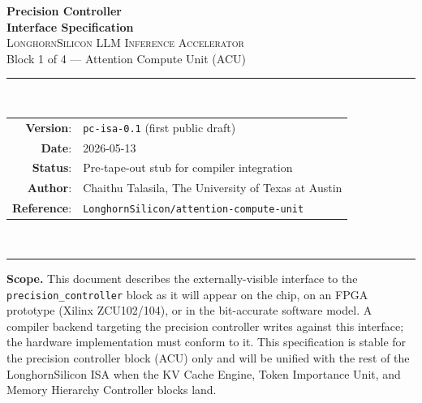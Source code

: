 \documentclass[11pt]{article}
\begin{document}
\thispagestyle{empty}
\begin{center}
\vspace*{1.2in}
{\Huge\bfseries Precision Controller}\\[0.4em]
{\LARGE\bfseries Interface Specification}\\[1.2em]

{\large \textsc{LonghornSilicon LLM Inference Accelerator}}\\[0.4em]
{\large Block 1 of 4 --- Attention Compute Unit (ACU)}\\[2em]

\rule{0.7\textwidth}{0.4pt}\\[1em]

\begin{tabular}{rl}
\textbf{Version}:    & \texttt{pc-isa-0.1} (first public draft) \\
\textbf{Date}:       & 2026-05-13 \\
\textbf{Status}:     & Pre-tape-out stub for compiler integration \\
\textbf{Author}:     & Chaithu Talasila, The University of Texas at Austin \\
\textbf{Reference}:  & \texttt{LonghornSilicon/attention-compute-unit} \\
\end{tabular}\\[1em]
\rule{0.7\textwidth}{0.4pt}

\vfill
\begin{minipage}{0.85\textwidth}
\small
\textbf{Scope.} This document describes the externally-visible interface to the
\texttt{precision\_controller} block as it will appear on the chip, on an
FPGA prototype (Xilinx ZCU102/104), or in the bit-accurate software model.
A compiler backend targeting the precision controller writes against this
interface; the hardware implementation must conform to it. This specification
is stable for the precision controller block (ACU) only and will be unified
with the rest of the LonghornSilicon ISA when the KV Cache Engine, Token
Importance Unit, and Memory Hierarchy Controller blocks land.
\end{minipage}

\vspace{0.3in}
\end{center}

\clearpage
\end{document}
